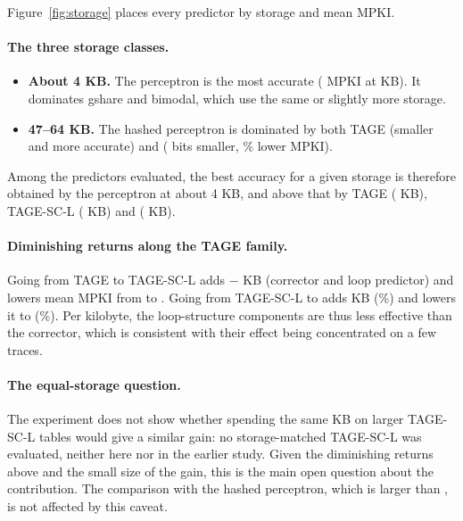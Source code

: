 Figure~\ref{fig:storage} places every predictor by storage and mean MPKI.

\paragraph{The three storage classes.}
\begin{itemize}
\item \textbf{About 4 KB.} The perceptron is the most accurate ( MPKI at  KB). It dominates gshare and bimodal, which use the same or slightly more storage.
\item \textbf{47--64 KB.} The hashed perceptron is dominated by both TAGE (smaller and more accurate) and \prop{} ( bits smaller, \% lower MPKI).
\end{itemize}
Among the predictors evaluated, the best accuracy for a given storage is therefore obtained by the perceptron at about 4 KB, and above that by TAGE ( KB), TAGE-SC-L ( KB) and \prop{} ( KB).

\paragraph{Diminishing returns along the TAGE family.} Going from TAGE to TAGE-SC-L adds  $-$  KB (corrector and loop predictor) and lowers mean MPKI from  to . Going from TAGE-SC-L to \prop{} adds  KB (\%) and lowers it to  (\%). Per kilobyte, the loop-structure components are thus less effective than the corrector, which is consistent with their effect being concentrated on a few traces.

\paragraph{The equal-storage question.} The experiment does not show whether spending the same  KB on larger TAGE-SC-L tables would give a similar gain: no storage-matched TAGE-SC-L was evaluated, neither here nor in the earlier study. Given the diminishing returns above and the small size of the gain, this is the main open question about the contribution. The comparison with the hashed perceptron, which is larger than \prop{}, is not affected by this caveat.
